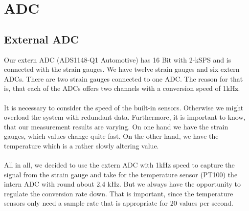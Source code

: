 \section{ADC}
\subsection{External ADC}
Our extern ADC (ADS1148-Q1 Automotive) has 16 Bit with 2-kSPS and is connected with the strain gauges. We have twelve strain gauges and six extern ADCs. There are two strain gauges connected to one ADC. The reason for that is, that each of the ADCs offers two channels with a conversion speed of 1kHz. \\ \\
It is necessary to consider the speed of the built-in sensors. Otherwise we might overload the system with redundant data. Furthermore, it is important to know, that our measurement results are varying. On one hand we have the strain gauges, which values change quite fast. On the other hand, we have the temperature which is a rather slowly altering value. \\ \\
All in all, we decided to use the extern ADC with 1kHz speed to capture the signal from the strain gauge and take for the temperature sensor (PT100) the intern
ADC with round about 2,4 kHz. But we always have the opportunity to regulate
the conversion rate down. That is important, since the temperature sensors only need
a sample rate that is appropriate for 20 values per second.
